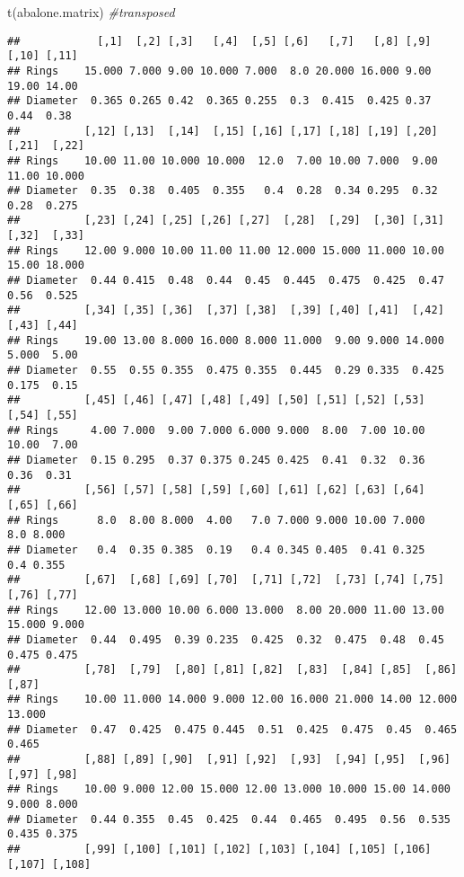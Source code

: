 \documentclass[
]{article}
\newenvironment{Shaded}{\begin{snugshade}}{\end{snugshade}}
\newcommand{\CommentTok}[1]{\textcolor[rgb]{0.56,0.35,0.01}{\textit{#1}}}
\newcommand{\FunctionTok}[1]{\textcolor[rgb]{0.00,0.00,0.00}{#1}}
\newcommand{\NormalTok}[1]{#1}
\begin{document}
\begin{Shaded}
\begin{Highlighting}[]
\FunctionTok{t}\NormalTok{(abalone.matrix) }\CommentTok{\#transposed}
\end{Highlighting}
\end{Shaded}

\begin{verbatim}
##            [,1]  [,2] [,3]   [,4]  [,5] [,6]   [,7]   [,8] [,9] [,10] [,11]
## Rings    15.000 7.000 9.00 10.000 7.000  8.0 20.000 16.000 9.00 19.00 14.00
## Diameter  0.365 0.265 0.42  0.365 0.255  0.3  0.415  0.425 0.37  0.44  0.38
##          [,12] [,13]  [,14]  [,15] [,16] [,17] [,18] [,19] [,20] [,21]  [,22]
## Rings    10.00 11.00 10.000 10.000  12.0  7.00 10.00 7.000  9.00 11.00 10.000
## Diameter  0.35  0.38  0.405  0.355   0.4  0.28  0.34 0.295  0.32  0.28  0.275
##          [,23] [,24] [,25] [,26] [,27]  [,28]  [,29]  [,30] [,31] [,32]  [,33]
## Rings    12.00 9.000 10.00 11.00 11.00 12.000 15.000 11.000 10.00 15.00 18.000
## Diameter  0.44 0.415  0.48  0.44  0.45  0.445  0.475  0.425  0.47  0.56  0.525
##          [,34] [,35] [,36]  [,37] [,38]  [,39] [,40] [,41]  [,42] [,43] [,44]
## Rings    19.00 13.00 8.000 16.000 8.000 11.000  9.00 9.000 14.000 5.000  5.00
## Diameter  0.55  0.55 0.355  0.475 0.355  0.445  0.29 0.335  0.425 0.175  0.15
##          [,45] [,46] [,47] [,48] [,49] [,50] [,51] [,52] [,53] [,54] [,55]
## Rings     4.00 7.000  9.00 7.000 6.000 9.000  8.00  7.00 10.00 10.00  7.00
## Diameter  0.15 0.295  0.37 0.375 0.245 0.425  0.41  0.32  0.36  0.36  0.31
##          [,56] [,57] [,58] [,59] [,60] [,61] [,62] [,63] [,64] [,65] [,66]
## Rings      8.0  8.00 8.000  4.00   7.0 7.000 9.000 10.00 7.000   8.0 8.000
## Diameter   0.4  0.35 0.385  0.19   0.4 0.345 0.405  0.41 0.325   0.4 0.355
##          [,67]  [,68] [,69] [,70]  [,71] [,72]  [,73] [,74] [,75]  [,76] [,77]
## Rings    12.00 13.000 10.00 6.000 13.000  8.00 20.000 11.00 13.00 15.000 9.000
## Diameter  0.44  0.495  0.39 0.235  0.425  0.32  0.475  0.48  0.45  0.475 0.475
##          [,78]  [,79]  [,80] [,81] [,82]  [,83]  [,84] [,85]  [,86]  [,87]
## Rings    10.00 11.000 14.000 9.000 12.00 16.000 21.000 14.00 12.000 13.000
## Diameter  0.47  0.425  0.475 0.445  0.51  0.425  0.475  0.45  0.465  0.465
##          [,88] [,89] [,90]  [,91] [,92]  [,93]  [,94] [,95]  [,96] [,97] [,98]
## Rings    10.00 9.000 12.00 15.000 12.00 13.000 10.000 15.00 14.000 9.000 8.000
## Diameter  0.44 0.355  0.45  0.425  0.44  0.465  0.495  0.56  0.535 0.435 0.375
##          [,99] [,100] [,101] [,102] [,103] [,104] [,105] [,106] [,107] [,108]

\end{verbatim}
\end{document}
